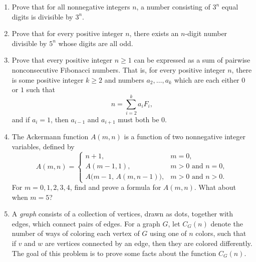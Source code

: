 \documentclass[11pt]{article}
\begin{document}
\begin{enumerate}
\item Prove that for all nonnegative integers $n$, a number consisting
of $3^n$ equal digits is divisible by $3^n$.

\item Prove that for every positive integer $n$, there exists an $n$-digit
number divisible by $5^n$ whose digits are all odd.

\item Prove that every positive integer $n\ge 1$ can be expressed as
a sum of pairwise nonconsecutive Fibonacci numbers. That
is, for every positive integer $n$, there is some positive integer
$k\ge 2$ and numbers $a_2,\ldots,a_k$ which are each either $0$ or $1$
such that
\[
n=\sum_{i=2}^k a_i F_i,
\]
and if $a_i=1$, then $a_{i-1}$ and $a_{i+1}$ must both be $0$.

\item The Ackermann function $A(m,n)$ is a function of two nonnegative
integer variables, defined by
\[
A(m,n)=
\begin{cases}
n+1, & m=0,\\[2pt]
A(m-1,1), & m>0\text{ and }n=0,\\[2pt]
A\bigl(m-1,\,A(m,n-1)\bigr), & m>0\text{ and }n>0.
\end{cases}
\]
For $m=0,1,2,3,4$, find and prove a formula for $A(m,n)$.
What about when $m=5$?

\item A \emph{graph} consists of a collection of vertices, drawn as dots,
together with edges, which connect pairs of edges. For a graph $G$,
let $C_G(n)$ denote the number of ways of coloring each vertex of $G$
using one of $n$ colors, such that if $v$ and $w$ are vertices connected
by an edge, then they are colored differently. The goal of this problem
is to prove some facts about the function $C_G(n)$.
\newline 
\begin{figure}[h]
\centering
{}


\end{figure}
\end{enumerate}
\end{document}
